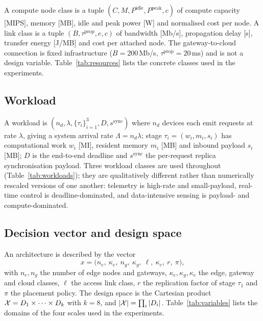 A compute node class is a tuple $(C, M, P^{\mathrm{idle}}, P^{\mathrm{peak}}, c)$ of
compute capacity [MIPS], memory [MB], idle and peak power [W] and normalised cost per
node. A link class is a tuple $(B, \tau^{\mathrm{prop}}, e, c)$ of bandwidth [Mb/s],
propagation delay [s], transfer energy [J/MB] and cost per attached node. The
gateway-to-cloud connection is fixed infrastructure ($B=200$\,Mb/s,
$\tau^{\mathrm{prop}}=20$\,ms) and is not a design variable. Table~\ref{tab:resources}
lists the concrete classes used in the experiments.

\begin{table}[t]
\centering
\caption{Resource classes. Compute classes: capacity $C$ [MIPS], memory $M$ [MB], idle
and peak power [W], cost [units]. Link classes: bandwidth $B$, propagation delay $\tau$,
transfer energy $e$, cost.}
\label{tab:resources}

\end{table}

\subsection{Workload}
A workload is $(n_d, \lambda, \{\tau_i\}_{i=1}^{3}, D, s^{\mathrm{sync}})$ where $n_d$
devices each emit requests at rate $\lambda$, giving a system arrival rate
$\Lambda = n_d\lambda$; stage $\tau_i=(w_i, m_i, s_i)$ has computational work $w_i$ [MI],
resident memory $m_i$ [MB] and inbound payload $s_i$ [MB]; $D$ is the end-to-end deadline
and $s^{\mathrm{sync}}$ the per-request replica synchronisation payload. Three workload
classes are used throughout (Table~\ref{tab:workloads}); they are qualitatively
different rather than numerically rescaled versions of one another: telemetry is
high-rate and small-payload, real-time control is deadline-dominated, and data-intensive
sensing is payload- and compute-dominated.

\begin{table}[t]
\centering
\caption{Workload classes. Stage values are given as
$\tau_1/\tau_2/\tau_3$.}
\label{tab:workloads}

\end{table}

\subsection{Decision vector and design space}
An architecture is described by the vector
\begin{equation}
x=\big(n_e,\ \kappa_e,\ n_g,\ \kappa_g,\ \ell,\ \kappa_c,\ r,\ \pi\big),
\label{eq:decision}
\end{equation}
with $n_e, n_g$ the number of edge nodes and gateways, $\kappa_e,\kappa_g,\kappa_c$ the
edge, gateway and cloud classes, $\ell$ the access link class, $r$ the replication
factor of stage $\tau_1$ and $\pi$ the placement policy. The design space is the
Cartesian product $\mathcal{X}=D_1\times\dots\times D_k$ with $k=8$, and
$|\mathcal{X}|=\prod_i |D_i|$. Table~\ref{tab:variables} lists the domains of the four scales
used in the experiments.


